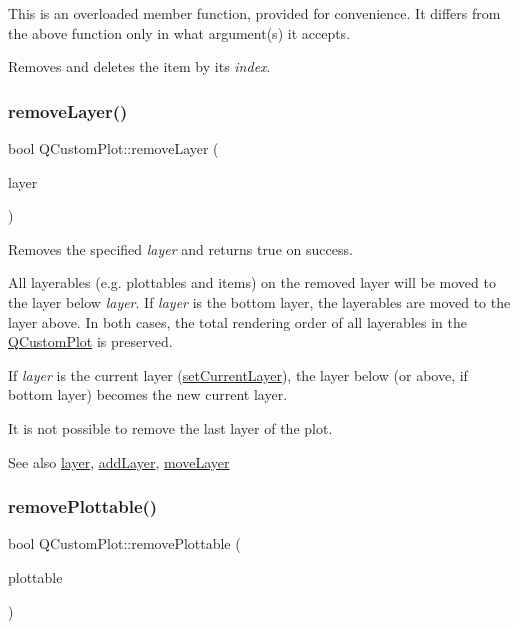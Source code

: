 This is an overloaded member function, provided for convenience. It differs from the above function only in what argument(s) it accepts.

Removes and deletes the item by its {\itshape index}. \mbox{\label{class_q_custom_plot_a40f75e342c5eaab6a86066a42a0e2a94}} 
\subsubsection{\texorpdfstring{removeLayer()}{removeLayer()}}
{\footnotesize\ttfamily bool Q\+Custom\+Plot\+::remove\+Layer (\begin{DoxyParamCaption}\item[{\mbox{\hyperlink{class_q_c_p_layer}{Q\+C\+P\+Layer}} $\ast$}]{layer }\end{DoxyParamCaption})}

Removes the specified {\itshape layer} and returns true on success.

All layerables (e.\+g. plottables and items) on the removed layer will be moved to the layer below {\itshape layer}. If {\itshape layer} is the bottom layer, the layerables are moved to the layer above. In both cases, the total rendering order of all layerables in the \mbox{\hyperlink{class_q_custom_plot}{Q\+Custom\+Plot}} is preserved.

If {\itshape layer} is the current layer (\mbox{\hyperlink{class_q_custom_plot_a73a6dc47c653bb6f8f030abca5a11852}{set\+Current\+Layer}}), the layer below (or above, if bottom layer) becomes the new current layer.

It is not possible to remove the last layer of the plot.

\begin{DoxySeeAlso}{See also}
\mbox{\hyperlink{class_q_custom_plot_a0a96244e7773b242ef23c32b7bdfb159}{layer}}, \mbox{\hyperlink{class_q_custom_plot_ad5255393df078448bb6ac83fa5db5f52}{add\+Layer}}, \mbox{\hyperlink{class_q_custom_plot_ae896140beff19424e9e9e02d6e331104}{move\+Layer}} 
\end{DoxySeeAlso}
\mbox{\label{class_q_custom_plot_af3dafd56884208474f311d6226513ab2}} 
\subsubsection{\texorpdfstring{removePlottable()}{removePlottable()}\hspace{0.1cm}{\footnotesize\ttfamily [1/2]}}
{\footnotesize\ttfamily bool Q\+Custom\+Plot\+::remove\+Plottable (\begin{DoxyParamCaption}\item[{\mbox{\hyperlink{class_q_c_p_abstract_plottable}{Q\+C\+P\+Abstract\+Plottable}} $\ast$}]{plottable }\end{DoxyParamCaption})}


